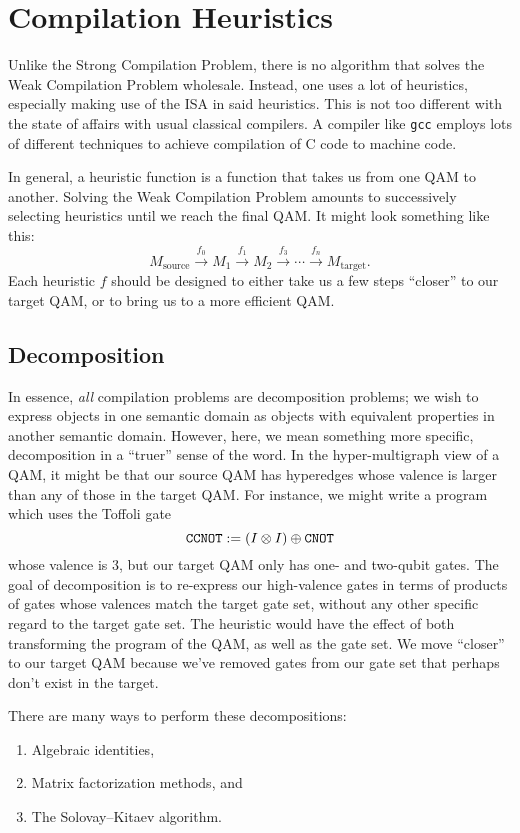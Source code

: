 \section{Compilation Heuristics}
Unlike the Strong Compilation Problem, there is no algorithm that solves the Weak Compilation Problem wholesale. Instead, one uses a lot of heuristics, especially making use of the ISA in said heuristics. This is not too different with the state of affairs with usual classical compilers. A compiler like \verb|gcc| employs lots of different techniques to achieve compilation of C code to machine code.

In general, a heuristic function is a function that takes us from one QAM to another. Solving the Weak Compilation Problem amounts to successively selecting heuristics until we reach the final QAM. It might look something like this:
\begin{displaymath}
M_{\textrm{source}}\xrightarrow{f_0} M_1 \xrightarrow{f_1} M_2 \xrightarrow{f_3}\cdots \xrightarrow{f_{n}} M_{\textrm{target}}.
\end{displaymath}
Each heuristic $f$ should be designed to either take us a few steps ``closer'' to our target QAM, or to bring us to a more efficient QAM. 

\subsection{Decomposition}
In essence, \emph{all} compilation problems are decomposition problems; we wish to express objects in one semantic domain as objects with equivalent properties in another semantic domain. However, here, we mean something more specific, decomposition in a ``truer'' sense of the word. In the hyper-multigraph view of a QAM, it might be that our source QAM has hyperedges whose valence is larger than any of those in the target QAM. For instance, we might write a program which uses the Toffoli gate \[\texttt{CCNOT} := (I \otimes I) \oplus \mathtt{CNOT}{}\] whose valence is $3$, but our target QAM only has one- and two-qubit gates. The goal of decomposition is to re-express our high-valence gates in terms of products of gates whose valences match the target gate set, without any other specific regard to the target gate set. The heuristic would have the effect of both transforming the program of the QAM, as well as the gate set. We move ``closer'' to our target QAM because we've removed gates from our gate set that perhaps don't exist in the target.

There are many ways to perform these decompositions:
\begin{enumerate}
    \item Algebraic identities,
    \item Matrix factorization methods, and
    \item The Solovay--Kitaev algorithm.
\end{enumerate}

